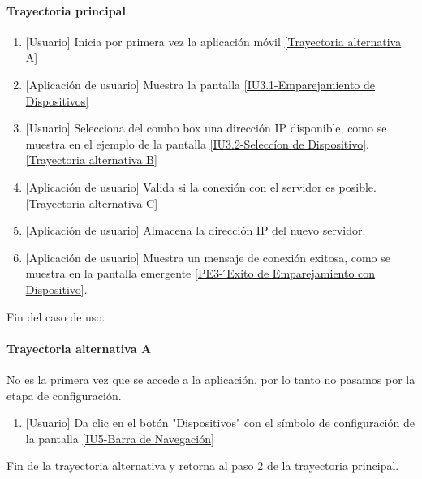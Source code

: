 \paragraph{Trayectoria principal} \label{SUB-U-CU1.4:TP}
	\begin{enumerate}
		\item {[Usuario]} Inicia por primera vez la aplicación móvil \hyperref[SUB-U-CU1.4:TA]{[Trayectoria alternativa A]} 
		\item {[Aplicación de usuario]} Muestra la pantalla \hyperref[fig:Emparejamiento Dispositivos]{[IU3.1-Emparejamiento de Dispositivos]}
		\item  {[Usuario]} Selecciona del combo box una dirección IP disponible, como se muestra en el ejemplo de la pantalla \hyperref[fig:Seleccion de Disposotivo]{[IU3.2-Seleccíon de Dispositivo]}. \hyperref[SUB-U-CU1.4:TB]{[Trayectoria alternativa B]}
		\item {[Aplicación de usuario]} Valida si la conexión con el servidor es posible. \hyperref[SUB-U-CU1.4:TC]{[Trayectoria alternativa C]}
		\item {[Aplicación de usuario]} Almacena la dirección IP del nuevo servidor.
		\item {[Aplicación de usuario]} Muestra un mensaje de conexión exitosa, como se muestra en la pantalla emergente \hyperref[fig:Exito Emparejamiento]{[PE3- ́Exito de Emparejamiento con Dispositivo]}.
	\end{enumerate}
	Fin del caso de uso.

\paragraph{Trayectoria alternativa A} \label{SUB-U-CU1.4:TA}
	No es la primera vez que se accede a la aplicación, por lo tanto no pasamos por la etapa de configuración.
	\begin{enumerate}[label=A\arabic*.]
		\item {[Usuario]} Da clic en el botón "Dispositivos" con el símbolo de configuración de la pantalla \hyperref[fig:Barra de navegacion]{[IU5-Barra de Navegación]}
	\end{enumerate}
	Fin de la trayectoria alternativa y retorna al paso 2 de la trayectoria principal.
	

